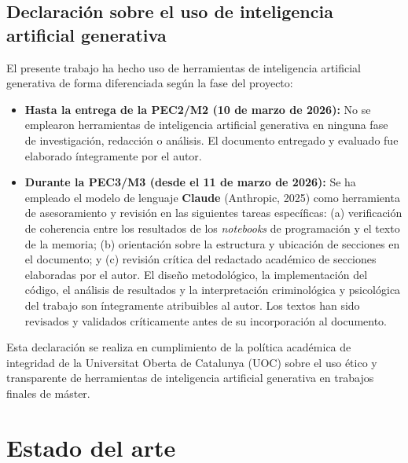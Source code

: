 \documentclass[IB]{TFUOC}%
\begin{document}
\section{Declaración sobre el uso de inteligencia artificial generativa}

El presente trabajo ha hecho uso de herramientas de inteligencia artificial 
generativa de forma diferenciada según la fase del proyecto:

\begin{itemize}
    \item \textbf{Hasta la entrega de la PEC2/M2 (10 de marzo de 2026):} 
    No se emplearon herramientas de inteligencia artificial generativa en 
    ninguna fase de investigación, redacción o análisis. El documento 
    entregado y evaluado fue elaborado íntegramente por el autor.

    \item \textbf{Durante la PEC3/M3 (desde el 11 de marzo de 2026):} 
    Se ha empleado el modelo de lenguaje \textbf{Claude} (Anthropic, 2025) 
    como herramienta de asesoramiento y revisión en las siguientes tareas 
    específicas: (a) verificación de coherencia entre los resultados de los 
    \textit{notebooks} de programación y el texto de la memoria; (b) 
    orientación sobre la estructura y ubicación de secciones en el documento; 
    y (c) revisión crítica del redactado académico de secciones elaboradas 
    por el autor. El diseño metodológico, la implementación del código, el 
    análisis de resultados y la interpretación criminológica y psicológica 
    del trabajo son íntegramente atribuibles al autor. Los textos han sido 
    revisados y validados críticamente antes de su incorporación al documento.
\end{itemize}

\noindent Esta declaración se realiza en cumplimiento de la política académica de 
integridad de la Universitat Oberta de Catalunya (UOC) sobre el uso ético 
y transparente de herramientas de inteligencia artificial generativa en 
trabajos finales de máster.



\chapter{Estado del arte}
\end{document}
